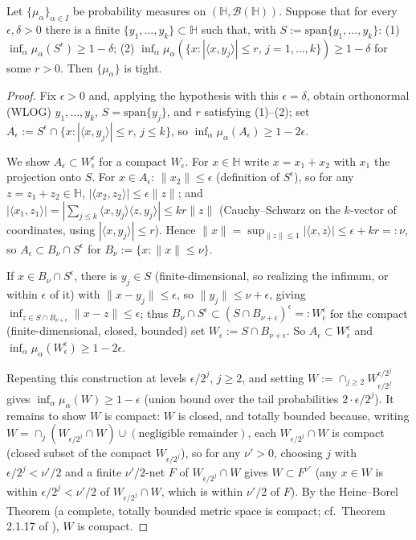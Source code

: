 \begin{theorem}
\label{thm:tightness_characterization}
Let $\{\mu_\alpha\}_{\alpha\in I}$ be probability measures on
$(\mathbb{H},\mathcal{B}(\mathbb{H}))$. Suppose that for every
$\epsilon,\delta>0$ there is a finite $\{y_1,\dots,y_k\}\subset\mathbb{H}$
such that, with $S:=\mathrm{span}\{y_1,\dots,y_k\}$: (1)
$\inf_\alpha\mu_\alpha(S^\epsilon)\geq 1-\delta$; (2) $\inf_\alpha
\mu_\alpha(\{x:|\langle x,y_j\rangle|\leq r,\,j=1,\dots,k\})\geq 1-\delta$
for some $r>0$. Then $\{\mu_\alpha\}$ is tight.
\end{theorem}

\begin{proof}
Fix $\epsilon>0$ and, applying the hypothesis with this $\epsilon=\delta$,
obtain orthonormal (WLOG) $y_1,\dots,y_k$, $S=\mathrm{span}\{y_j\}$, and
$r$ satisfying (1)--(2); set $A_\epsilon := S^\epsilon\cap\{x:|\langle x,
y_j\rangle|\leq r,\,j\leq k\}$, so $\inf_\alpha\mu_\alpha(A_\epsilon)\geq
1-2\epsilon$.

We show $A_\epsilon\subset W_\epsilon^\epsilon$ for a compact $W_\epsilon$.
For $x\in\mathbb{H}$ write $x=x_1+x_2$ with $x_1$ the projection onto $S$.
For $x\in A_\epsilon$: $\|x_2\|\leq\epsilon$ (definition of $S^\epsilon$),
so for any $z=z_1+z_2\in\mathbb{H}$, $|\langle x_2,z_2\rangle|\leq
\epsilon\|z\|$; and $|\langle x_1,z_1\rangle| = |\sum_{j\leq k}\langle
x,y_j\rangle\langle z,y_j\rangle|\leq kr\|z\|$ (Cauchy--Schwarz on the
$k$-vector of coordinates, using $|\langle x,y_j\rangle|\leq r$). Hence
$\|x\| = \sup_{\|z\|\leq1}|\langle x,z\rangle|\leq\epsilon+kr=:\nu$, so
$A_\epsilon\subset B_\nu\cap S^\epsilon$ for $B_\nu:=\{x:\|x\|\leq\nu\}$.

If $x\in B_\nu\cap S^\epsilon$, there is $y_j\in S$ (finite-dimensional,
so realizing the infimum, or within $\epsilon$ of it) with $\|x-y_j\|\leq
\epsilon$, so $\|y_j\|\leq\nu+\epsilon$, giving $\inf_{z\in S\cap
B_{\nu+\epsilon}}\|x-z\|\leq\epsilon$; thus $B_\nu\cap S^\epsilon\subset
(S\cap B_{\nu+\epsilon})^\epsilon =: W_\epsilon^\epsilon$ for the compact
(finite-dimensional, closed, bounded) set $W_\epsilon:=S\cap B_{\nu+
\epsilon}$. So $A_\epsilon\subset W_\epsilon^\epsilon$ and $\inf_\alpha
\mu_\alpha(W_\epsilon^\epsilon)\geq 1-2\epsilon$.

Repeating this construction at levels $\epsilon/2^j$, $j\geq 2$, and
setting $W:=\cap_{j\geq2}W_{\epsilon/2^j}^{\epsilon/2^j}$ gives $\inf_
\alpha\mu_\alpha(W)\geq 1-\epsilon$ (union bound over the tail
probabilities $2\cdot\epsilon/2^j$). It remains to show $W$ is compact:
$W$ is closed, and totally bounded because, writing $W=\cap_j(W_{\epsilon/
2^j}\cap W)\cup(\text{negligible remainder})$, each $W_{\epsilon/2^j}\cap
W$ is compact (closed subset of the compact $W_{\epsilon/2^j}$), so for
any $\nu'>0$, choosing $j$ with $\epsilon/2^j<\nu'/2$ and a finite
$\nu'/2$-net $F$ of $W_{\epsilon/2^j}\cap W$ gives $W\subset F^{\nu'}$ (any
$x\in W$ is within $\epsilon/2^j<\nu'/2$ of $W_{\epsilon/2^j}\cap W$,
which is within $\nu'/2$ of $F$). By the Heine--Borel Theorem (a complete,
totally bounded metric space is compact; cf.\ Theorem 2.1.17 of
\cite{hsingeubank2015}), $W$ is compact.
\end{proof}


